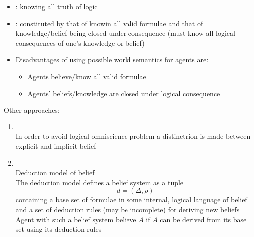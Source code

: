 \begin{itemize}
\item {}: knowing all truth of logic
\item {}: constituted by that of knowin all valid formulae and that of knowledge/belief being closed under consequence (must know all logical consequences of one's knowledge or belief)
\item Disadvantages of using possible world semantics for agents are:
\begin{itemize}
\item Agents believe/know all valid formulae
\item Agents' beliefs/knowledge are closed under logical consequence
\end{itemize}
\end{itemize}

Other approaches:
\begin{enumerate}
\item {}\\
In order to avoid logical omniscience problem a distinctrion is made between explicit and implicit belief
\item {}\\
Deduction model of belief\\
The deduction model defines a belief system as a tuple
\[d=(\Delta, \rho)\]
containing a base set of formulae in some internal, logical language of belief and a set of deduction rules (may be incomplete) for deriving new beliefs\\
Agent with such a belief system believe $A$ if $A$ can be derived from its base set using its deduction rules
\end{enumerate}



